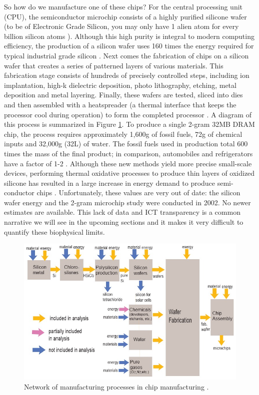 \documentclass{article}
\begin{document}
So how do we manufacture one of these chips? For the central processing unit (CPU), the semiconductor microchip consists of a highly purified silicone wafer (to be of Electronic Grade Silicon, you may only have 1 alien atom for every billion silicon atoms \cite{intel2011makingachip}). Although this high purity is integral to modern computing efficiency, the production of a silicon wafer uses 160 times the energy required for typical industrial grade silicon \cite{williams20021}. Next comes the fabrication of chips on a silicon wafer that creates a series of patterned layers of various materials. This fabrication stage consists of hundreds of precisely controlled steps, including ion implantation, high-k dielectric deposition, photo lithography, etching, metal deposition and metal layering. Finally, these wafers are tested, sliced into dies and then assembled with a heatspreader (a thermal interface that keeps the processor cool during operation) to form the completed processor \cite{intel2011makingachip}. A diagram of this process is summarized in Figure \ref{production_chip}. To produce a single 2-gram 32MB DRAM chip, the process requires approximately 1,600g of fossil fuels, 72g of chemical inputs and 32,000g (32L) of water. The fossil fuels used in production total 600 times the mass of the final product; in comparison, automobiles and refrigerators have a factor of  1-2 \cite{williams20021}. Although these new methods yield more precise small-scale devices, performing thermal oxidative processes to produce thin layers of oxidized silicone has resulted in a large increase in energy demand to produce semi-conductor chips  \cite{gutowski2009thermodynamic}. Unfortunately, these values are very out of date: the silicon wafer energy and the 2-gram microchip study were conducted in 2002. No newer estimates are available. This lack of data and ICT transparency is a common narrative we will see in the upcoming sections and it makes it very difficult to quantify these biophysical limits.

\begin{figure}[h]
    \includegraphics[width=.9 \textwidth]{./images/production_chip.jpg}
    \centering
    \caption{Network of manufacturing processes in chip manufacturing \cite{williams2004environmental}.}
    \label{production_chip}
\end{figure}
\end{document}

